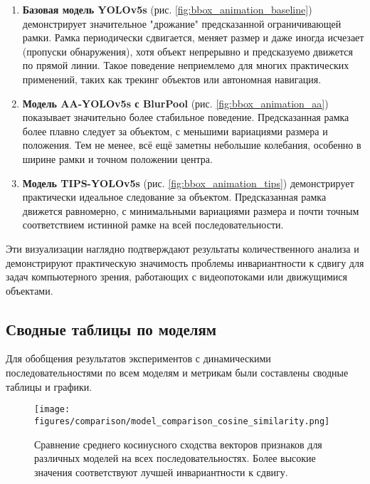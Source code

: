 \begin{enumerate}
    \item \textbf{Базовая модель YOLOv5s} (рис. \ref{fig:bbox_animation_baseline}) демонстрирует значительное "дрожание" предсказанной ограничивающей рамки. Рамка периодически сдвигается, меняет размер и даже иногда исчезает (пропуски обнаружения), хотя объект непрерывно и предсказуемо движется по прямой линии. Такое поведение неприемлемо для многих практических применений, таких как трекинг объектов или автономная навигация.
    
    \item \textbf{Модель AA-YOLOv5s с BlurPool} (рис. \ref{fig:bbox_animation_aa}) показывает значительно более стабильное поведение. Предсказанная рамка более плавно следует за объектом, с меньшими вариациями размера и положения. Тем не менее, всё ещё заметны небольшие колебания, особенно в ширине рамки и точном положении центра.
    
    \item \textbf{Модель TIPS-YOLOv5s} (рис. \ref{fig:bbox_animation_tips}) демонстрирует практически идеальное следование за объектом. Предсказанная рамка движется равномерно, с минимальными вариациями размера и почти точным соответствием истинной рамке на всей последовательности.
\end{enumerate}

Эти визуализации наглядно подтверждают результаты количественного анализа и демонстрируют практическую значимость проблемы инвариантности к сдвигу для задач компьютерного зрения, работающих с видеопотоками или движущимися объектами.

\subsection{Сводные таблицы по моделям}
\label{experiments:dynamic:comparison_tables}

Для обобщения результатов экспериментов с динамическими последовательностями по всем моделям и метрикам были составлены сводные таблицы и графики.

\begin{figure}[ht]
\centering
\texttt{[image: figures/comparison/model\_comparison\_cosine\_similarity.png]}
\caption{Сравнение среднего косинусного сходства векторов признаков для различных моделей на всех последовательностях. Более высокие значения соответствуют лучшей инвариантности к сдвигу.}
\label{fig:model_comparison_cosine}
\end{figure}

